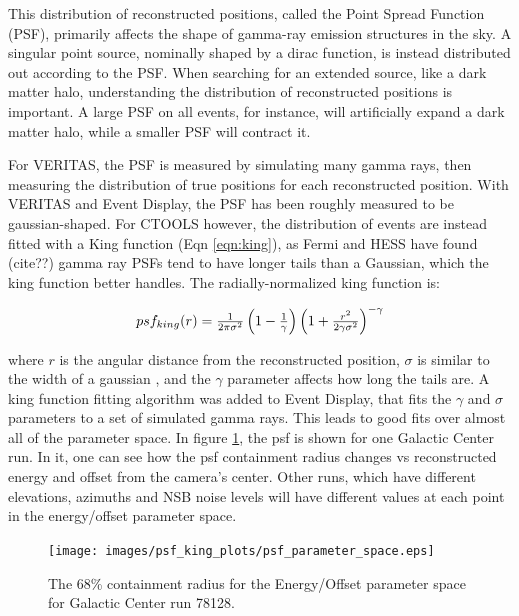 This distribution of reconstructed positions, called the Point Spread Function (PSF), primarily affects the shape of gamma-ray emission structures in the sky.
A singular point source, nominally shaped by a dirac function, is instead distributed out according to the PSF.
When searching for an extended source, like a dark matter halo, understanding the distribution of reconstructed positions is important.
A large PSF on all events, for instance, will artificially expand a dark matter halo, while a smaller PSF will contract it.

For VERITAS, the PSF is measured by simulating many gamma rays, then measuring the distribution of true positions for each reconstructed position.
With VERITAS and Event Display, the PSF has been roughly measured to be gaussian-shaped.
For CTOOLS however, the distribution of events are instead fitted with a King function (Eqn \ref{eqn:king}), as Fermi and HESS have found (cite??) gamma ray PSFs tend to have longer tails than a Gaussian, which the king function better handles.
The radially-normalized king function is:

\begin{equation} \label{eqn:king}
$$ psf_{king}(r) = \frac{1}{2 \pi \sigma^{2} } \left( 1 - \frac{1}{\gamma} \right) \left( 1 + \frac{ r^{2} }{ 2 \gamma \sigma^{2} } \right)^{-\gamma} $$
\end{equation}

where $r$ is the angular distance from the reconstructed position, $\sigma$ is similar to the width of a gaussian , and the $\gamma$ parameter affects how long the tails are.
A king function fitting algorithm was added to Event Display, that fits the $\gamma$ and $\sigma$ parameters to a set of simulated gamma rays.
This leads to good fits over almost all of the parameter space.
In figure \ref{fig:psf_paramspace}, the psf is shown for one Galactic Center run.
In it, one can see how the psf containment radius changes vs reconstructed energy and offset from the camera's center.
Other runs, which have different elevations, azimuths and NSB noise levels will have different values at each point in the energy/offset parameter space.

\begin{figure}[ht]
  \begin{center}
    \texttt{[image: images/psf\_king\_plots/psf\_parameter\_space.eps]}
    \caption[PSF Parameter Space]{The 68\% containment radius for the Energy/Offset parameter space for Galactic Center run 78128.}\label{fig:psf_paramspace}
  \end{center}
\end{figure}

